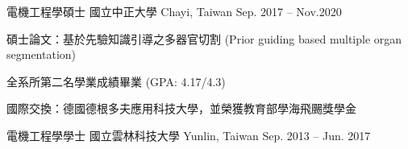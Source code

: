 

\begin{cventries}

  \cventry
    {電機工程學碩士} %
    {國立中正大學} %
    {Chayi, Taiwan} %
    {Sep. 2017 – Nov.2020} %
    {
    \begin{cvitems}
      \item 碩士論文：基於先驗知識引導之多器官切割 (Prior guiding based multiple organ segmentation)
      \item 全系所第二名學業成績畢業 (GPA: 4.17/4.3)
      \item 國際交換：德國德根多夫應用科技大學，並榮獲教育部學海飛颺獎學金
    \end{cvitems}
    }

  \cventry
    {電機工程學學士} %
    {國立雲林科技大學} %
    {Yunlin, Taiwan} %
    {Sep. 2013 – Jun. 2017} %
    {}

\end{cventries}
